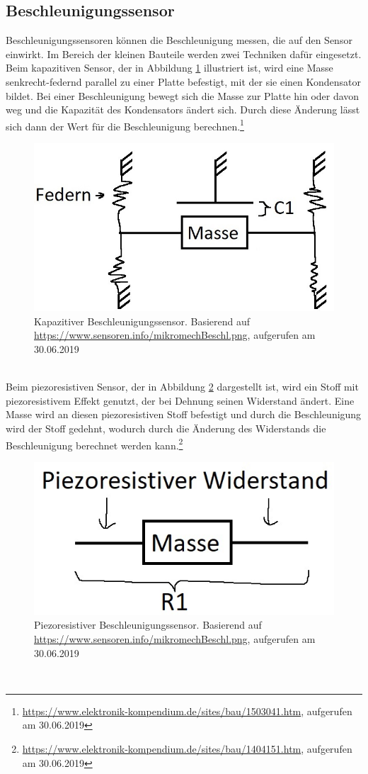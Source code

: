 \subsection{Beschleunigungssensor}
Beschleunigungssensoren können die Beschleunigung messen, die auf den Sensor einwirkt.
Im Bereich der kleinen Bauteile werden zwei Techniken dafür eingesetzt.\\
Beim kapazitiven Sensor, der in Abbildung \ref{fig:pic_accel_kapa} illustriert ist, wird eine Masse senkrecht-federnd parallel zu einer Platte befestigt, mit der sie einen Kondensator bildet.
Bei einer Beschleunigung bewegt sich die Masse zur Platte hin oder davon weg und die Kapazität des Kondensators ändert sich.
Durch diese Änderung lässt sich dann der Wert für die Beschleunigung berechnen.\footnote{\url{https://www.elektronik-kompendium.de/sites/bau/1503041.htm}, aufgerufen am 30.06.2019}
\begin{figure}[h]
	\centering
	\includegraphics[width=0.33\linewidth]{res/kinAccel.jpg}
	\caption{Kapazitiver Beschleunigungssensor. Basierend auf \url{https://www.sensoren.info/mikromechBeschl.png}, aufgerufen am 30.06.2019}
	\label{fig:pic_accel_kapa}
\end{figure}\\
Beim piezoresistiven Sensor, der in Abbildung \ref{fig:pic_accel_pie} dargestellt ist, wird ein Stoff mit piezoresistivem Effekt genutzt, der bei Dehnung seinen Widerstand ändert.
Eine Masse wird an diesen piezoresistiven Stoff befestigt und durch die Beschleunigung wird der Stoff gedehnt, wodurch durch die Änderung des Widerstands die Beschleunigung berechnet werden kann.\footnote{\url{https://www.elektronik-kompendium.de/sites/bau/1404151.htm}, aufgerufen am 30.06.2019}
\begin{figure}[h]
	\centering
	\includegraphics[width=0.25\linewidth]{res/prAccel.jpg}
	\caption{Piezoresistiver Beschleunigungssensor. Basierend auf \url{https://www.sensoren.info/mikromechBeschl.png}, aufgerufen am 30.06.2019}
	\label{fig:pic_accel_pie}
\end{figure}\\

